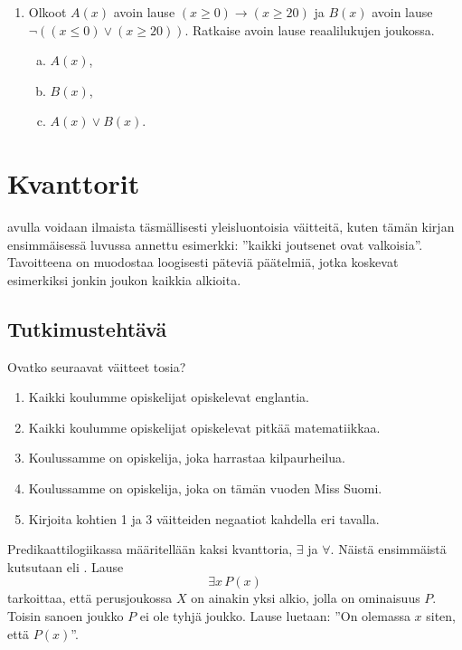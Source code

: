 \begin{enumerate}
\item
Olkoot $A(x)$ avoin lause $(x \ge 0) \to (x \ge 20)$
ja $B(x)$ avoin lause $\lnot ((x \le 0) \lor (x \ge 20))$. Ratkaise avoin lause reaalilukujen joukossa.
\begin{enumerate}[a)]
\item $A(x)$,
\item $B(x)$,
\item $A(x) \lor B(x)$.
\end{enumerate}

\end{enumerate}



\newpage

\section{Kvanttorit}
 avulla voidaan ilmaista täsmällisesti yleisluontoisia väitteitä, kuten tämän kirjan ensimmäisessä luvussa annettu esimerkki: ''kaikki joutsenet ovat valkoisia''. Tavoitteena on muodostaa loogisesti päteviä päätelmiä, jotka koskevat esimerkiksi jonkin joukon kaikkia alkioita.

\subsection*{Tutkimustehtävä}
Ovatko seuraavat väitteet tosia?
\begin{enumerate}
\item Kaikki koulumme opiskelijat opiskelevat englantia.
\item Kaikki koulumme opiskelijat opiskelevat pitkää matematiikkaa.
\item Koulussamme on opiskelija, joka harrastaa kilpaurheilua.
\item Koulussamme on opiskelija, joka on tämän vuoden Miss Suomi.
\item Kirjoita kohtien 1 ja 3 väitteiden negaatiot kahdella eri tavalla. 
\end{enumerate}

Predikaattilogiikassa määritellään kaksi kvanttoria, $\exists$ ja $\forall$. Näistä ensimmäistä kutsutaan  eli . Lause
\[
\exists x\, P(x)
\]
tarkoittaa, että perusjoukossa $X$ on ainakin yksi alkio, jolla on ominaisuus $P$. Toisin sanoen joukko $P$ ei ole tyhjä joukko. Lause luetaan: ''On olemassa $x$ siten, että $P(x)$''.

